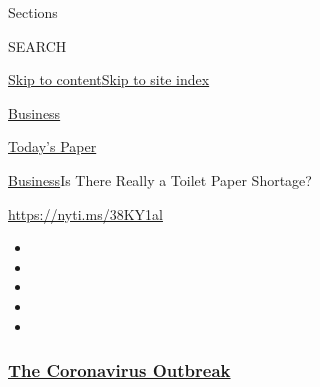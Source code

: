 Sections

SEARCH

\protect\hyperlink{site-content}{Skip to
content}\protect\hyperlink{site-index}{Skip to site index}

\href{https://www.nytimes3xbfgragh.onion/section/business}{Business}

\href{https://myaccount.nytimes3xbfgragh.onion/auth/login?response_type=cookie\&client_id=vi}{}

\href{https://www.nytimes3xbfgragh.onion/section/todayspaper}{Today's
Paper}

\href{/section/business}{Business}\textbar{}Is There Really a Toilet
Paper Shortage?

\url{https://nyti.ms/38KY1al}

\begin{itemize}
\item
\item
\item
\item
\item
\end{itemize}

\hypertarget{the-coronavirus-outbreak}{%
\subsubsection{\texorpdfstring{\href{https://www.nytimes3xbfgragh.onion/news-event/coronavirus?name=styln-coronavirus-markets\&region=TOP_BANNER\&variant=undefined\&block=storyline_menu_recirc\&action=click\&pgtype=Article\&impression_id=4575b940-e385-11ea-bdca-c743cc6a6463}{The
Coronavirus
Outbreak}}{The Coronavirus Outbreak}}\label{the-coronavirus-outbreak}}

